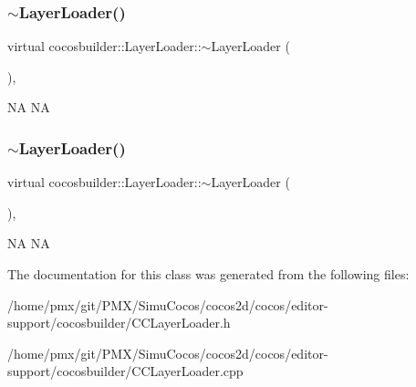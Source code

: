 \subsubsection{\texorpdfstring{$\sim$\+Layer\+Loader()}{~LayerLoader()}\hspace{0.1cm}{\footnotesize\ttfamily [1/2]}}
{\footnotesize\ttfamily virtual cocosbuilder\+::\+Layer\+Loader\+::$\sim$\+Layer\+Loader (\begin{DoxyParamCaption}{ }\end{DoxyParamCaption})\hspace{0.3cm}{\ttfamily [inline]}, {\ttfamily [virtual]}}

NA  NA \mbox{\label{classcocosbuilder_1_1LayerLoader_abc4fcc903ab66147e64425ef18bdeefa}} 
\subsubsection{\texorpdfstring{$\sim$\+Layer\+Loader()}{~LayerLoader()}\hspace{0.1cm}{\footnotesize\ttfamily [2/2]}}
{\footnotesize\ttfamily virtual cocosbuilder\+::\+Layer\+Loader\+::$\sim$\+Layer\+Loader (\begin{DoxyParamCaption}{ }\end{DoxyParamCaption})\hspace{0.3cm}{\ttfamily [inline]}, {\ttfamily [virtual]}}

NA  NA 

The documentation for this class was generated from the following files\+:\begin{DoxyCompactItemize}
\item 
/home/pmx/git/\+P\+M\+X/\+Simu\+Cocos/cocos2d/cocos/editor-\/support/cocosbuilder/C\+C\+Layer\+Loader.\+h\item 
/home/pmx/git/\+P\+M\+X/\+Simu\+Cocos/cocos2d/cocos/editor-\/support/cocosbuilder/C\+C\+Layer\+Loader.\+cpp\end{DoxyCompactItemize}
